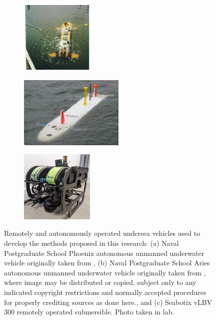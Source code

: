 \documentclass[applsci,article,submit,pdftex,moreauthors]{Definitions/mdpi}
\begin{document}
\begin{figure} [h]

     \centering
     \begin{subfigure} %
     \centering
         \includegraphics[width=3.5cm]{Phoenix.png} 
      \label{fig:Phoenix}
     \end{subfigure}
     \hfill
     \begin{subfigure}%
         \centering
         \includegraphics[width=5cm]{aries .png}
         \label{fig:Phoenix}
     \end{subfigure}
     \hfill
     \begin{subfigure}%
         \centering
         \includegraphics[width=3.5cm]{vlbv_002_crop.jpg}
         \label{fig:Phoenix}
     \end{subfigure}
        \caption{Remotely and autonomously operated undersea vehicles used to develop the methods proposed in this research: (a) Naval Postgraduate School Phoenix autonomous unmanned underwater vehicle \cite{Sands20} originally taken from \cite{NPS22}, (b) Naval Postgraduate School Aries autonomous unmanned underwater vehicle \cite{Sands18} originally taken from \cite{NPS22}, where image may be distributed or copied, subject only to any indicated copyright restrictions and normally accepted procedures for properly crediting sources as done here.\cite{NPSCopy22}, and (c) Seabotix vLBV 300 remotely operated submersible. Photo taken in lab.}
        \label{fig:three graphs}
\end{figure}
\end{document}
